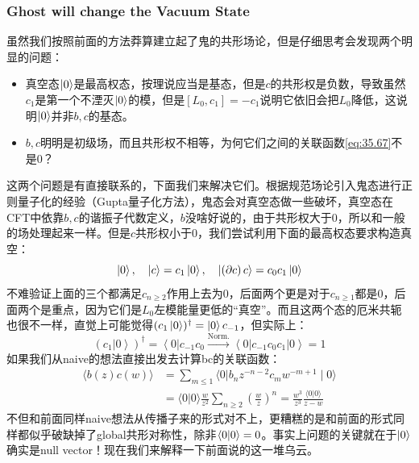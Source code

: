 \subsubsection{Ghost will change the Vacuum State}
虽然我们按照前面的方法莽算建立起了鬼的共形场论，但是仔细思考会发现两个明显的问题：
\begin{itemize}
	\item 真空态$\ket{0}$是最高权态，按理说应当是基态，但是$c$的共形权是负数，导致虽然$c_{1}$是第一个不湮灭$\ket{0}$的模，但是$[L_0,c_1]=-c_1$说明它依旧会把$L_0$降低，这说明$\ket{0}$并非$b,c$的基态。
	
	\item $b,c$明明是初级场，而且共形权不相等，为何它们之间的关联函数\ref{eq:35.67}不是0？
\end{itemize}
这两个问题是有直接联系的，下面我们来解决它们。根据规范场论引入鬼态进行正则量子化的经验（Gupta量子化方法），鬼态会对真空态做一些破坏，真空态在CFT中依靠$b,c$的谐振子代数定义，$b$没啥好说的，由于共形权大于0，所以和一般的场处理起来一样。但是$c$共形权小于0，我们尝试利用下面的最高权态要求构造真空：
\begin{equation}
	\ket{0},\quad\left|c\right\rangle=c_1\left|0\right\rangle,\quad\left|\left(\partial c\right)c\right\rangle=c_0c_1\left|0\right\rangle 
\end{equation}
不难验证上面的三个都满足$c_{n\geq 2}$作用上去为0，后面两个更是对于$c_{n\geq 1}$都是0，后面两个是重点，因为它们是$L_0$左模能量更低的“真空”。而且这两个态的厄米共轭也很不一样，直觉上可能觉得$(c_{1}\ket{0})^\dagger=\ket{0}c_{-1}$，但实际上：
\begin{equation}
	(c_1\left|0\right\rangle)^\dagger=\left<0\right|c_{-1}c_0\xrightarrow{\text{Norm.}}\left\langle0\right|c_{-1}c_0c_1\left|0\right\rangle=1
\end{equation}
如果我们从naive的想法直接出发去计算bc的关联函数：
\begin{equation}
	\begin{aligned}\langle b(z)c(w)\rangle&=\sum_{m\leq1}\langle0|b_nz^{-n-2}c_mw^{-m+1}\mid0\rangle\\&=\langle0|0\rangle\frac w{z^2}\sum_{n\geq2}\left(\frac wz\right)^n=\frac{w^3}{z^3}\frac{\langle0|0\rangle}{z-w}\end{aligned}
\end{equation}
不但和前面同样naive想法从传播子来的形式对不上，更糟糕的是和前面的形式同样都似乎破缺掉了global共形对称性，除非$\braket{0}{0}=0$。事实上问题的关键就在于$\ket{0}$确实是null vector！现在我们来解释一下前面说的这一堆乌云。

